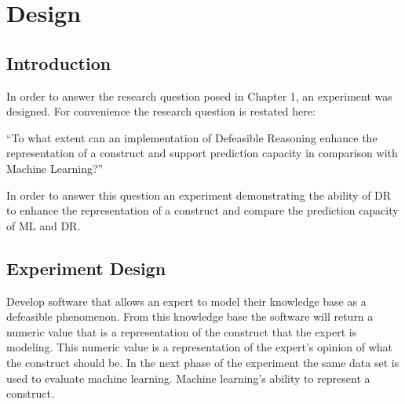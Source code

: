 
\chapter{Design} %

\label{Chapter3} %



\section{Introduction}

In order to answer the research question posed in Chapter 1, an experiment was designed. For convenience the research question is restated here:

``To what extent can an implementation of Defeasible Reasoning enhance the representation of a construct and support prediction capacity in comparison with Machine Learning?''

In order to answer this question an experiment demonstrating the ability of DR to enhance the representation of a construct and compare the prediction capacity of ML and DR.



\section{Experiment Design}

Develop software that allows an expert to model their knowledge base as a defeasible phenomenon. From this knowledge base the software will return a numeric value that is a representation of the construct that the expert is modeling. This numeric value is a representation of the expert's opinion of what the construct should be.
In the next phase of the experiment the same data set is used to evaluate machine learning. Machine learning's ability to represent a construct.

